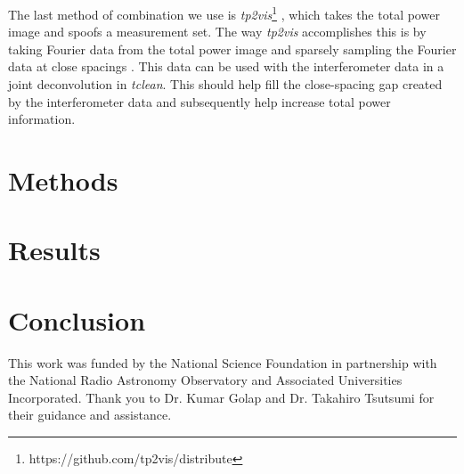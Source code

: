 \documentclass[manuscript,linenumbers]{aastex62}
\begin{document}
The last method of combination we use is \textit{tp2vis}\footnote{https://github.com/tp2vis/distribute} , which takes the total power image and spoofs a measurement set. The way \textit{tp2vis} accomplishes this is by taking Fourier data from the total power image and sparsely sampling the Fourier data at close spacings \citep[see][]{2011ApJS..193...19K}. This data can be used with the interferometer data in a joint deconvolution in \textit{tclean}. This should help fill the close-spacing gap created by the interferometer data and subsequently help increase total power information.

\section{Methods}

\section{Results}

\section{Conclusion}


\acknowledgments
This work was funded by the National Science Foundation in partnership with the National Radio Astronomy Observatory and Associated Universities Incorporated. Thank you to Dr. Kumar Golap and Dr. Takahiro Tsutsumi for their guidance and assistance. 


\end{document}
